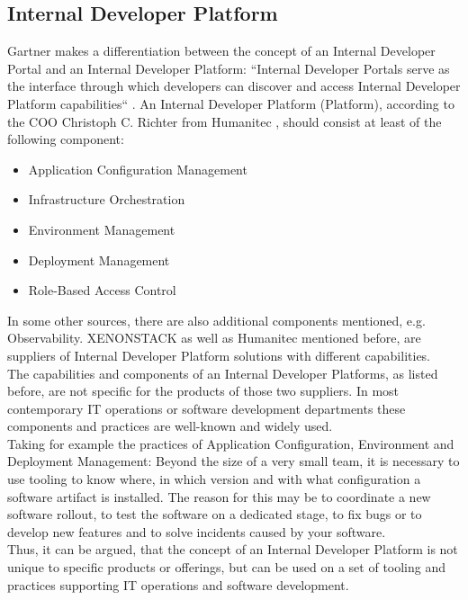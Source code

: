 \documentclass[a4paper,12pt]{article}
\begin{document}
    \subsection{Internal Developer Platform}
    \label{subsec:vpplatform}
    Gartner makes a differentiation between the concept of an Internal Developer Portal and an Internal Developer Platform:
    ``Internal Developer Portals serve as the interface through which developers can discover and
    access Internal Developer Platform capabilities``\parencite{gartner} .
    An Internal Developer Platform (Platform), according to the COO Christoph C. Richter from Humanitec\parencite{richteretal} ,
    should consist at least of the following component:
    \begin{itemize}
        \item Application Configuration Management
        \item Infrastructure Orchestration
        \item Environment Management
        \item Deployment Management
        \item Role-Based Access Control
    \end{itemize}
    In some other sources, there are also additional components mentioned, e.g. Observability\parencite{xenon}.
    XENONSTACK as well as Humanitec mentioned before, are suppliers of Internal Developer Platform solutions with
    different capabilities.\\
    The capabilities and components of an Internal Developer Platforms, as listed before,  are not specific for the products
    of those two suppliers.
    In most contemporary IT operations or software development departments these components and practices are well-known
    and widely used.\\
    Taking for example the practices of Application Configuration, Environment and Deployment Management:
    Beyond the size of a very small team, it is necessary to use tooling to know where, in which version
    and with what configuration a software artifact is installed.
    The reason for this may be to coordinate a new software rollout, to test the software on a dedicated stage, to fix bugs
    or to develop new features and to solve incidents caused by your software.\\
    Thus, it can be argued, that the concept of an Internal Developer Platform is not unique to specific products
    or offerings, but can be used on a set of tooling and practices supporting IT operations and software development.
\end{document}

